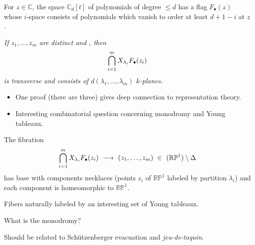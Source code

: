 \documentclass[17pt,landscape]{Narrow}
\newcommand{\DeCo}{\RoyalBlue}
\renewcommand{\P}{{\mathbb P}}
\newcommand{\C}{{\mathbb C}}
\newcommand{\R}{{\mathbb R}}
\begin{document}
\begin{flushleft}
\slide{}
\LogoOn
\begin{center}
\end{center}


For $z\in\C$, the space $\C_d[t]$ of polynomials
of degree $\leq d$ has a flag $F_\bullet(z)$ 
whose $i$-space consists of polynomials which vanish to order
at least $d{+}1{-}i$ at $z$.

\newline
{\sl 
   If $z_1,\dotsc,z_m$ are distinct and \DeCo{real}, then\vspace{-8pt}
\[
   \bigcap_{i=1}^m X_{\lambda_i}F_\bullet(z_i)\vspace{-8pt}
\]
 is transverse and consists of $d(\lambda_1,\dotsc,\lambda_m)$ \DeCo{real} $k$-planes. 
}

\begin{itemize}
\item[\Red{$\to$}] One proof (there are three) gives deep connection to representation theory.

\item[\Red{$\leadsto$}] Interesting combinatorial question concerning monodromy and Young tableaux.
\end{itemize}
\slide{}
\LogoOn
\begin{center}
\end{center}

The fibration\vspace{-8pt}
\[
    \bigcap_{i=1}^m X_{\lambda_i} F_\bullet(z_i)\  \longrightarrow\ 
      (z_1,\dotsc,z_m)\ \in\ (\R\P^1)\setminus\Delta\vspace{-8pt}
\]
has base with components necklaces (points $z_i$ of $\R\P^1$ labeled by
partition $\lambda_i$) and each component is homeomorphic to $\R\P^1$.

Fibers naturally labeled by an interesting set of Young tableaux.

  What is the monodromy?

Should be related to Sch\"utzenberger evacuation and {\sl jeu-de-taquin}.

\end{flushleft}
\end{document}
